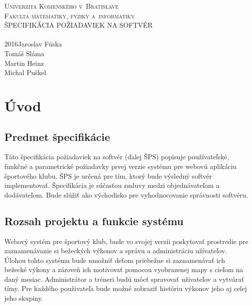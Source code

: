 \documentclass[12pt,a4paper]{report}
\theoremstyle{definition}
\theoremstyle{remark}
\begin{document}
%

\def\nazov{ŠPECIFIKÁCIA POŽIADAVIEK NA SOFTVÉR}
\def\autorJ{Jaroslav Fúska }
\def\autorT{Tomáš Sláma }
\def\autorH{ Martin Heinz }
\def\autorM{Michal Puškel }
\def\fakulta{Fakulta matematiky, fyziky a~informatiky}
\def\univerzita{Univerzita Komenského v~Bratislave}
\def\mesto{Bratislava}
\def\typprace{Športový klub}
\def\rok{2016}
\thispagestyle{empty}
\begin{center}
\textsc{\LARGE\univerzita}\\
\bigskip\textsc{\LARGE\fakulta}\\
\vfill\textsc{\Huge\nazov}\\
\medskip{\Large\typprace}\\
\vfill{\large\rok\hfill\autorJ\\ \hfill\autorT \\ \hfill \autorH \\ \hfill \autorM}
\end{center}

\tableofcontents

\chapter{Úvod}

\section{Predmet špecifikácie}
Táto špecifikácia požiadaviek na softvér (ďalej ŠPS) popisuje používateľské, funkčné a parametrické požiadavky prvej verzie systému pre webovú aplikáciu športového klubu. ŠPS je určená pre tím, ktorý bude výsledný   softvér   implementovať.  Špecifikácia   je   súčasťou   zmluvy   medzi   objednávateľom a dodávateľom.  Bude slúžiť ako  východisko  pre vyhodnocovanie správnosti softvéru.

\section{Rozsah projektu a funkcie systému}
Webový systém pre športový klub, bude vo svojej verzii poskytovať prostredie pre zaznamenávanie si bežeckých výkonov a správu a administráciu užívateľov. Úlohou tohto systému bude umožniť deťom priebežne si zaznamenávať ich bežecké výkony a zároveň ich motivovať pomocou vyobrazenej mapy s cieľom na daný mesiac. Administrátor a tréneri budú môcť spravovať uživateľov a vytvárať tímy. Pre každého použivateľa bude možné zobraziť históriu výkonov jeho aj celej jeho skupiny.
\end{document}
